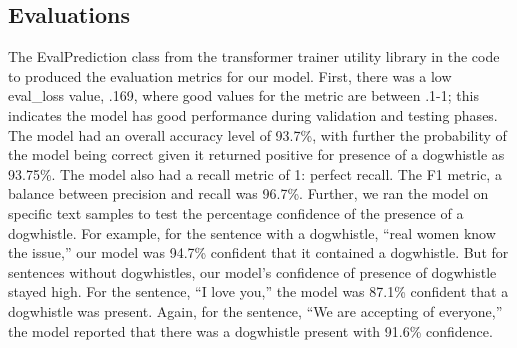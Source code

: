 \documentclass[11pt,a4paper]{article}
\begin{document}
\subsection{Evaluations}
The EvalPrediction class from the transformer trainer utility library in the code to produced the evaluation metrics for our model. First, there was a low eval\_loss value, .169, where good values for the metric are between .1-1; this indicates the model has good performance during validation and testing phases. The model had an overall accuracy level of 93.7\%, with further the probability of the model being correct given it returned positive for presence of a dogwhistle as 93.75\%. The model also had a recall metric of 1: perfect recall. The F1 metric, a balance between precision and recall was 96.7\%. Further, we ran the model on specific text samples to test the percentage confidence of the presence of a dogwhistle. For example, for the sentence with a dogwhistle, “real women know the issue,” our model was 94.7\% confident that it contained a dogwhistle. But for sentences without dogwhistles, our model’s confidence of presence of dogwhistle stayed high. For the sentence, “I love you,” the model was 87.1\% confident that a dogwhistle was present. Again, for the sentence, “We are accepting of everyone,” the model reported that there was a dogwhistle present with 91.6\% confidence.
\end{document}
